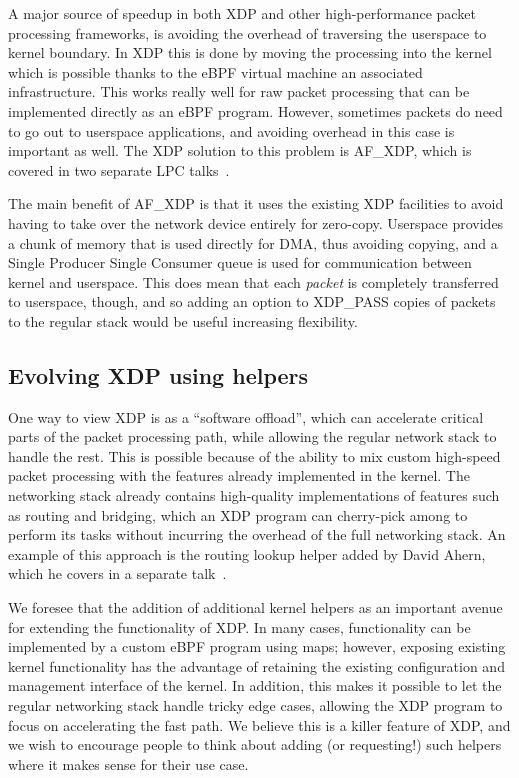 \documentclass[sigconf]{acmart}
\begin{document}
A major source of speedup in both XDP and other high-performance packet
processing frameworks, is avoiding the overhead of traversing the userspace to
kernel boundary. In XDP this is done by moving the processing into the kernel
which is possible thanks to the eBPF virtual machine an associated
infrastructure. This works really well for raw packet processing that can be
implemented directly as an eBPF program. However, sometimes packets do need to
go out to userspace applications, and avoiding overhead in this case is
important as well. The XDP solution to this problem is AF\_XDP, which is covered
in two separate LPC talks~\cite{af-xdp,xdp-ovs}.

The main benefit of AF\_XDP is that it uses the existing XDP facilities to avoid
having to take over the network device entirely for zero-copy. Userspace
provides a chunk of memory that is used directly for DMA, thus avoiding copying,
and a Single Producer Single Consumer queue is used for communication between
kernel and userspace. This does mean that each \emph{packet} is completely
transferred to userspace, though, and so adding an option to XDP\_PASS copies of
packets to the regular stack would be useful increasing flexibility.


\subsection{Evolving XDP using helpers}
\label{sec:evolving-xdp}

One way to view XDP is as a ``software offload'', which can accelerate critical
parts of the packet processing path, while allowing the regular network stack to
handle the rest. This is possible because of the ability to mix custom
high-speed packet processing with the features already implemented in the
kernel. The networking stack already contains high-quality implementations of
features such as routing and bridging, which an XDP program can cherry-pick
among to perform its tasks without incurring the overhead of the full networking
stack. An example of this approach is the routing lookup helper added by David
Ahern, which he covers in a separate talk~\cite{ahern-routing}.

We foresee that the addition of additional kernel helpers as an important avenue
for extending the functionality of XDP. In many cases, functionality can be
implemented by a custom eBPF program using maps; however, exposing existing
kernel functionality has the advantage of retaining the existing configuration
and management interface of the kernel. In addition, this makes it possible to
let the regular networking stack handle tricky edge cases, allowing the XDP
program to focus on accelerating the fast path. We believe this is a killer
feature of XDP, and we wish to encourage people to think about adding (or
requesting!) such helpers where it makes sense for their use case.
\end{document}
